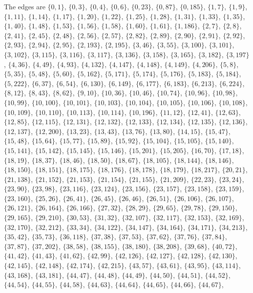 \documentclass[11pt]{article}
\begin{document}
The edges are $\{0,1\}$, $\{0,3\}$, $\{0,4\}$, $\{0,6\}$, $\{0,23\}$, $\{0,87\}$, $\{0,185\}$, $\{1,7\}$, $\{1,9\}$, $\{1,11\}$, $\{1,14\}$, $\{1,17\}$, $\{1,20\}$, $\{1,22\}$, $\{1,25\}$, $\{1,28\}$, $\{1,31\}$, $\{1,33\}$, $\{1,35\}$, $\{1,40\}$, $\{1,48\}$, $\{1,53\}$, $\{1,56\}$, $\{1,58\}$, $\{1,60\}$, $\{1,61\}$, $\{1,186\}$, $\{2,7\}$, $\{2,8\}$, $\{2,41\}$, $\{2,45\}$, $\{2,48\}$, $\{2,56\}$, $\{2,57\}$, $\{2,82\}$, $\{2,89\}$, $\{2,90\}$, $\{2,91\}$, $\{2,92\}$, $\{2,93\}$, $\{2,94\}$, $\{2,95\}$, $\{2,193\}$, $\{2,195\}$, $\{3,46\}$, $\{3,55\}$, $\{3,100\}$, $\{3,101\}$, $\{3,102\}$, $\{3,115\}$, $\{3,116\}$, $\{3,117\}$, $\{3,136\}$, $\{3,158\}$, $\{3,165\}$, $\{3,182\}$, $\{3,197\}$, $\{4,36\}$, $\{4,49\}$, $\{4,93\}$, $\{4,132\}$, $\{4,147\}$, $\{4,148\}$, $\{4,149\}$, $\{4,206\}$, $\{5,8\}$, $\{5,35\}$, $\{5,48\}$, $\{5,60\}$, $\{5,162\}$, $\{5,171\}$, $\{5,174\}$, $\{5,176\}$, $\{5,183\}$, $\{5,184\}$, $\{5,222\}$, $\{6,37\}$, $\{6,54\}$, $\{6,130\}$, $\{6,149\}$, $\{6,177\}$, $\{6,183\}$, $\{6,213\}$, $\{6,224\}$, $\{8,12\}$, $\{8,43\}$, $\{8,62\}$, $\{9,10\}$, $\{10,36\}$, $\{10,46\}$, $\{10,74\}$, $\{10,96\}$, $\{10,98\}$, $\{10,99\}$, $\{10,100\}$, $\{10,101\}$, $\{10,103\}$, $\{10,104\}$, $\{10,105\}$, $\{10,106\}$, $\{10,108\}$, $\{10,109\}$, $\{10,110\}$, $\{10,113\}$, $\{10,114\}$, $\{10,196\}$, $\{11,12\}$, $\{12,41\}$, $\{12,63\}$, $\{12,85\}$, $\{12,115\}$, $\{12,131\}$, $\{12,132\}$, $\{12,133\}$, $\{12,134\}$, $\{12,135\}$, $\{12,136\}$, $\{12,137\}$, $\{12,200\}$, $\{13,23\}$, $\{13,43\}$, $\{13,76\}$, $\{13,80\}$, $\{14,15\}$, $\{15,47\}$, $\{15,48\}$, $\{15,64\}$, $\{15,77\}$, $\{15,89\}$, $\{15,92\}$, $\{15,104\}$, $\{15,105\}$, $\{15,140\}$, $\{15,141\}$, $\{15,142\}$, $\{15,145\}$, $\{15,146\}$, $\{15,201\}$, $\{15,205\}$, $\{16,70\}$, $\{17,18\}$, $\{18,19\}$, $\{18,37\}$, $\{18,46\}$, $\{18,50\}$, $\{18,67\}$, $\{18,105\}$, $\{18,144\}$, $\{18,146\}$, $\{18,150\}$, $\{18,151\}$, $\{18,175\}$, $\{18,176\}$, $\{18,178\}$, $\{18,179\}$, $\{18,217\}$, $\{20,21\}$, $\{21,138\}$, $\{21,152\}$, $\{21,153\}$, $\{21,154\}$, $\{21,155\}$, $\{21,209\}$, $\{22,23\}$, $\{23,24\}$, $\{23,90\}$, $\{23,98\}$, $\{23,116\}$, $\{23,124\}$, $\{23,156\}$, $\{23,157\}$, $\{23,158\}$, $\{23,159\}$, $\{23,160\}$, $\{25,26\}$, $\{26,41\}$, $\{26,45\}$, $\{26,46\}$, $\{26,51\}$, $\{26,106\}$, $\{26,107\}$, $\{26,121\}$, $\{26,164\}$, $\{26,166\}$, $\{27,32\}$, $\{28,29\}$, $\{29,65\}$, $\{29,78\}$, $\{29,150\}$, $\{29,165\}$, $\{29,210\}$, $\{30,53\}$, $\{31,32\}$, $\{32,107\}$, $\{32,117\}$, $\{32,153\}$, $\{32,169\}$, $\{32,170\}$, $\{32,212\}$, $\{33,34\}$, $\{34,122\}$, $\{34,147\}$, $\{34,164\}$, $\{34,171\}$, $\{34,213\}$, $\{35,42\}$, $\{35,73\}$, $\{36,118\}$, $\{37,38\}$, $\{37,53\}$, $\{37,62\}$, $\{37,76\}$, $\{37,84\}$, $\{37,87\}$, $\{37,202\}$, $\{38,58\}$, $\{38,155\}$, $\{38,180\}$, $\{38,208\}$, $\{39,68\}$, $\{40,72\}$, $\{41,42\}$, $\{41,43\}$, $\{41,62\}$, $\{42,99\}$, $\{42,126\}$, $\{42,127\}$, $\{42,128\}$, $\{42,130\}$, $\{42,145\}$, $\{42,148\}$, $\{42,174\}$, $\{42,215\}$, $\{43,57\}$, $\{43,61\}$, $\{43,95\}$, $\{43,114\}$, $\{43,168\}$, $\{43,181\}$, $\{44,47\}$, $\{44,48\}$, $\{44,49\}$, $\{44,50\}$, $\{44,51\}$, $\{44,52\}$, $\{44,54\}$, $\{44,55\}$, $\{44,58\}$, $\{44,63\}$, $\{44,64\}$, $\{44,65\}$, $\{44,66\}$, $\{44,67\}$, 
\end{document}
